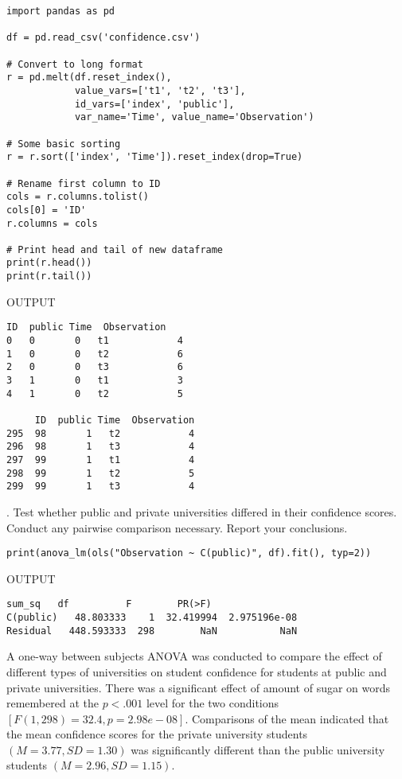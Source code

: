\documentclass[onecolumn,10pt]{jhwhw}
\begin{document}
\begin{lstlisting}
import pandas as pd

df = pd.read_csv('confidence.csv')

# Convert to long format
r = pd.melt(df.reset_index(),
            value_vars=['t1', 't2', 't3'],
            id_vars=['index', 'public'],
            var_name='Time', value_name='Observation')

# Some basic sorting
r = r.sort(['index', 'Time']).reset_index(drop=True)

# Rename first column to ID
cols = r.columns.tolist()
cols[0] = 'ID'
r.columns = cols

# Print head and tail of new dataframe
print(r.head())
print(r.tail())
\end{lstlisting}
\noindent OUTPUT
\begin{lstlisting}[language={}]
   ID  public Time  Observation
0   0       0   t1            4
1   0       0   t2            6
2   0       0   t3            6
3   1       0   t1            3
4   1       0   t2            5

     ID  public Time  Observation
295  98       1   t2            4
296  98       1   t3            4
297  99       1   t1            4
298  99       1   t2            5
299  99       1   t3            4
\end{lstlisting}

. Test whether public and private universities differed in their confidence scores. Conduct any pairwise comparison necessary. Report your conclusions.

\begin{lstlisting}
print(anova_lm(ols("Observation ~ C(public)", df).fit(), typ=2))
\end{lstlisting}
\noindent OUTPUT
\begin{lstlisting}[language={}]
               sum_sq   df          F        PR(>F)
C(public)   48.803333    1  32.419994  2.975196e-08
Residual   448.593333  298        NaN           NaN
\end{lstlisting}

A one-way between subjects ANOVA was conducted to compare the effect of different types of universities on student confidence for students at public and private universities. There was a significant effect of amount of sugar on words remembered at the $p<.001$ level for the two conditions $[F(1, 298) = 32.4, p = 2.98e-08]$. Comparisons of the mean indicated that the mean confidence scores for the private university students $(M=3.77, SD=1.30)$ was significantly different than the public university students $(M=2.96, SD=1.15)$.\\
\end{document}
